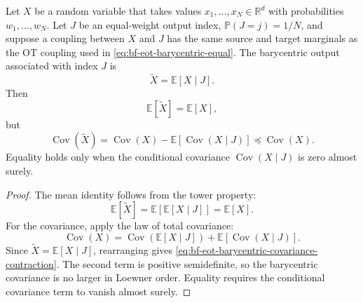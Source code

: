 \begin{proposition}
\label{prop:bf-eot-barycentric-covariance-contraction}
Let \(X\) be a random variable that takes values \(x_1,\ldots,x_N\in\mathbb R^d\)
with probabilities \(w_1,\ldots,w_N\).  Let \(J\) be an equal-weight output index,
\(\mathbb P(J=j)=1/N\), and suppose a coupling between \(X\) and \(J\) has the
same source and target marginals as the OT coupling used in
\eqref{eq:bf-eot-barycentric-equal}.  The barycentric output associated with
index \(J\) is
\[
  \widetilde X = \mathbb E[X\mid J].
\]
Then
\begin{equation}
\label{eq:bf-eot-barycentric-mean-preservation}
  \mathbb E[\widetilde X]=\mathbb E[X],
\end{equation}
but
\begin{equation}
\label{eq:bf-eot-barycentric-covariance-contraction}
  \operatorname{Cov}(\widetilde X)
  =
  \operatorname{Cov}(X)
  -
  \mathbb E\!\left[\operatorname{Cov}(X\mid J)\right]
  \preceq
  \operatorname{Cov}(X).
\end{equation}
Equality holds only when the conditional covariance
\(\operatorname{Cov}(X\mid J)\) is zero almost surely.
\end{proposition}

\begin{proof}
The mean identity follows from the tower property:
\[
  \mathbb E[\widetilde X]
  =
  \mathbb E[\mathbb E[X\mid J]]
  =
  \mathbb E[X].
\]
For the covariance, apply the law of total covariance:
\[
  \operatorname{Cov}(X)
  =
  \operatorname{Cov}\!\left(\mathbb E[X\mid J]\right)
  +
  \mathbb E\!\left[\operatorname{Cov}(X\mid J)\right].
\]
Since \(\widetilde X=\mathbb E[X\mid J]\), rearranging gives
\eqref{eq:bf-eot-barycentric-covariance-contraction}.  The second term is
positive semidefinite, so the barycentric covariance is no larger in Loewner
order.  Equality requires the conditional covariance term to vanish almost
surely.
\end{proof}

